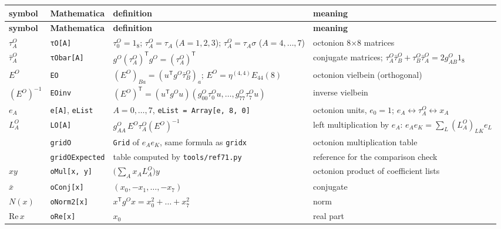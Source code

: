 \documentclass[10pt,a4paper]{article}
\begin{document}
{\footnotesize
\begin{longtable}{>{\raggedright\arraybackslash}p{}>{\raggedright\arraybackslash}p{}>{\raggedright\arraybackslash}p{}>{\raggedright\arraybackslash}p{}}
\toprule
\textbf{symbol} & \textbf{Mathematica} & \textbf{definition} & \textbf{meaning} \\
\midrule\endfirsthead
\toprule
\textbf{symbol} & \textbf{Mathematica} & \textbf{definition} & \textbf{meaning} \\
\midrule\endhead
\endfoot
\bottomrule\endlastfoot
$\tau^{O}_A$ & \texttt{τO[A]} & $\tau^{O}_0=1_8$; $\tau^{O}_A=\tau_A$ ($A=1,2,3$); $\tau^{O}_A=\tau_A\sigma$ ($A=4,\dots,7$) & octonion 8×8 matrices \\
$\bar\tau^{O}_A$ & \texttt{τObar[A]} & $g^{O}(\tau^{O}_A)^{\mathsf T}g^{O}=(\tau^{O}_A)^{\mathsf T}$ & conjugate matrices; $\tau^{O}_A\bar\tau^{O}_B+\tau^{O}_B\bar\tau^{O}_A=2g^{O}_{AB}1_8$ \\
$E^{O}$ & \texttt{EO} & $(E^{O})_{Ba}=(u^{\mathsf T}g^{O}\bar\tau^{O}_B)_a$; $E^{O}=\eta^{(4,4)}E_{44}(8)$ & octonion vielbein (orthogonal) \\
$(E^{O})^{-1}$ & \texttt{EOinv} & $(E^{O})^{\mathsf T}=(u^{\mathsf T}g^{O}u)(g^{O}_{00}\tau^{O}_0u,\dots,g^{O}_{77}\tau^{O}_7u)$ & inverse vielbein \\
$e_A$ & \texttt{e[A]}, \texttt{eList} & $A=0,\dots,7$, \texttt{eList = Array[e, 8, 0]} & octonion units, $e_0=1$; $e_A\leftrightarrow\tau^{O}_A\leftrightarrow x_A$ \\
$L^{O}_A$ & \texttt{LO[A]} & $g^{O}_{AA}\,E^{O}\tau^{O}_A(E^{O})^{-1}$ & left multiplication by $e_A$: $e_Ae_K=\sum_L(L^{O}_A)_{LK}e_L$ \\
 & \texttt{gridO} & \texttt{Grid} of $e_Ae_K$, same formula as \texttt{gridx} & octonion multiplication table \\
 & \texttt{gridOExpected} & table computed by \texttt{tools/\allowbreak{}ref71.py} & reference for the comparison check \\
$xy$ & \texttt{oMul[x, y]} & $\big(\sum_Ax_AL^{O}_A\big)y$ & octonion product of coefficient lists \\
$\bar x$ & \texttt{oConj[x]} & $(x_0,-x_1,\dots,-x_7)$ & conjugate \\
$N(x)$ & \texttt{oNorm2[x]} & $x^{\mathsf T}g^{O}x=x_0^2+\dots+x_7^2$ & norm \\
$\mathrm{Re}\,x$ & \texttt{oRe[x]} & $x_0$ & real part \\

\end{longtable}}
\end{document}
